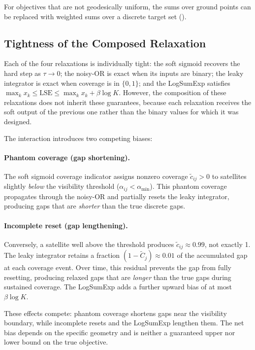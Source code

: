 For objectives that are not geodesically uniform, the sums over ground points can be replaced with weighted sums over a discrete target set (). 

\subsection{Tightness of the Composed Relaxation}
\label{sec:tightness}

Each of the four relaxations is individually tight: the soft sigmoid recovers the hard step as $\tau \to 0$; the noisy-OR is exact when its inputs are binary; the leaky integrator is exact when coverage is in $\{0, 1\}$; and the LogSumExp satisfies $\max_k x_k \leq \text{LSE} \leq \max_k x_k + \beta \log K$.
However, the composition of these relaxations does not inherit these guarantees, because each relaxation receives the soft output of the previous one rather than the binary values for which it was designed.

The interaction introduces two competing biases:

\paragraph{Phantom coverage (gap shortening).}
The soft sigmoid coverage indicator assigns nonzero coverage $\tilde{c}_{ij} > 0$ to satellites slightly \emph{below} the visibility threshold ($\alpha_{ij} < \alpha_{\min}$).
This phantom coverage propagates through the noisy-OR and partially resets the leaky integrator, producing gaps that are \emph{shorter} than the true discrete gaps.

\paragraph{Incomplete reset (gap lengthening).} \label{para:gap_lengthening}
Conversely, a satellite well above the threshold produces $\tilde{c}_{ij} \approx 0.99$, not exactly 1.
The leaky integrator retains a fraction $(1 - \tilde{C}_j) \approx 0.01$ of the accumulated gap at each coverage event.
Over time, this residual prevents the gap from fully resetting, producing relaxed gaps that are \emph{longer} than the true gaps during sustained coverage.
The LogSumExp adds a further upward bias of at most $\beta \log K$.

These effects compete: phantom coverage shortens gaps near the visibility boundary, while incomplete resets and the LogSumExp lengthen them.
The net bias depends on the specific geometry and is neither a guaranteed upper nor lower bound on the true objective.

